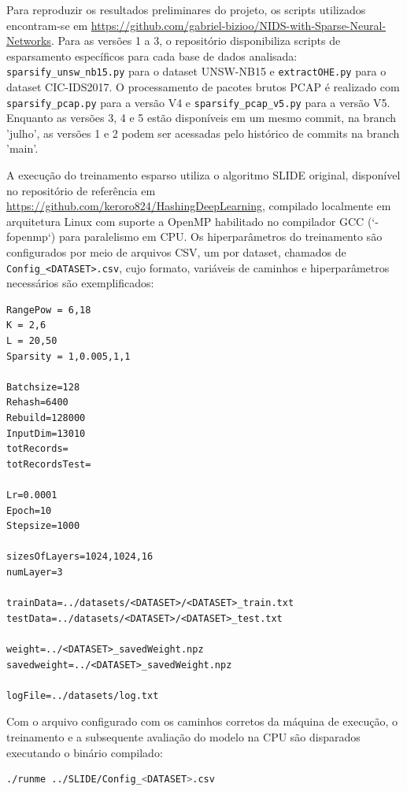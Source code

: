 \documentclass[11pt,a4paper,oneside]{article}
\begin{document}
Para reproduzir os resultados preliminares do projeto, os scripts utilizados encontram-se em \url{https://github.com/gabriel-bizioo/NIDS-with-Sparse-Neural-Networks}. Para as versões 1 a 3, o repositório disponibiliza scripts de esparsamento específicos para cada base de dados analisada: \texttt{sparsify\_unsw\_nb15.py} para o dataset UNSW-NB15 e \texttt{extractOHE.py} para o dataset CIC-IDS2017. O processamento de pacotes brutos PCAP é realizado com \texttt{sparsify\_pcap.py} para a versão V4 e \texttt{sparsify\_pcap\_v5.py} para a versão V5. Enquanto as versões 3, 4 e 5 estão disponíveis em um mesmo commit, na branch 'julho', as versões 1 e 2 podem ser acessadas pelo histórico de commits na branch 'main'.

A execução do treinamento esparso utiliza o algoritmo SLIDE original, disponível no repositório de referência em \url{https://github.com/keroro824/HashingDeepLearning}, compilado localmente em arquitetura Linux com suporte a OpenMP habilitado no compilador GCC (`-fopenmp`) para paralelismo em CPU.
Os hiperparâmetros do treinamento são configurados por meio de arquivos CSV, um por dataset, chamados de \texttt{Config\_<DATASET>.csv}, cujo formato, variáveis de caminhos e hiperparâmetros necessários são exemplificados:

\begin{lstlisting}[caption={Exemplo de Configuração de Parâmetros (Config\_<DATASET>.csv)}]
RangePow = 6,18
K = 2,6
L = 20,50
Sparsity = 1,0.005,1,1

Batchsize=128
Rehash=6400
Rebuild=128000
InputDim=13010
totRecords=
totRecordsTest=

Lr=0.0001
Epoch=10
Stepsize=1000

sizesOfLayers=1024,1024,16
numLayer=3

trainData=../datasets/<DATASET>/<DATASET>_train.txt
testData=../datasets/<DATASET>/<DATASET>_test.txt

weight=../<DATASET>_savedWeight.npz
savedweight=../<DATASET>_savedWeight.npz

logFile=../datasets/log.txt
\end{lstlisting}

Com o arquivo configurado com os caminhos corretos da máquina de execução, o treinamento e a subsequente avaliação do modelo na CPU são disparados executando o binário compilado:
\begin{lstlisting}[language=bash]
./runme ../SLIDE/Config_<DATASET>.csv
\end{lstlisting}
\end{document}
